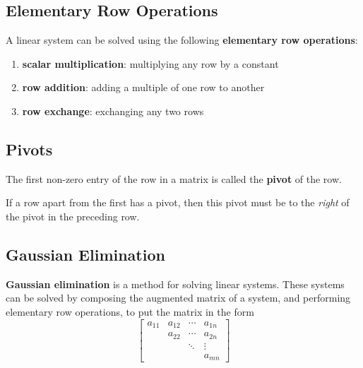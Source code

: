 \documentclass{article}
\begin{document}
\subsection{Elementary Row Operations}
\begin{definition}
    A linear system can be solved using the following
    \textbf{elementary row operations}:
    \begin{enumerate}
        \item \textbf{scalar multiplication}: multiplying any row by a
              constant
        \item \textbf{row addition}: adding a multiple of one row to
              another
        \item \textbf{row exchange}: exchanging any two rows
    \end{enumerate}
    \subsection{Pivots}
\end{definition}
\begin{definition}
    The first non-zero entry of the row in a matrix is called the
    \textbf{pivot} of the row.
\end{definition}
\begin{theorem}
    \label{theorem:pivots}
    If a row apart from the first has a pivot, then this pivot must be
    to the \textit{right} of the pivot in the preceding row.
\end{theorem}
\subsection{Gaussian Elimination}
\begin{definition}
    \textbf{Gaussian elimination} is a method for solving linear
    systems. These systems can be solved by composing the augmented
    matrix of a system, and performing elementary row operations, to put
    the matrix in the form
    \begin{equation*}
        \begin{bmatrix}
            a_{11} & a_{12} & \cdots & a_{1n} \\
                   & a_{22} & \cdots & a_{2n} \\
                   &        & \ddots & \vdots \\
                   &        &        & a_{mn}
        \end{bmatrix}
    \end{equation*}
\end{definition}
\end{document}
